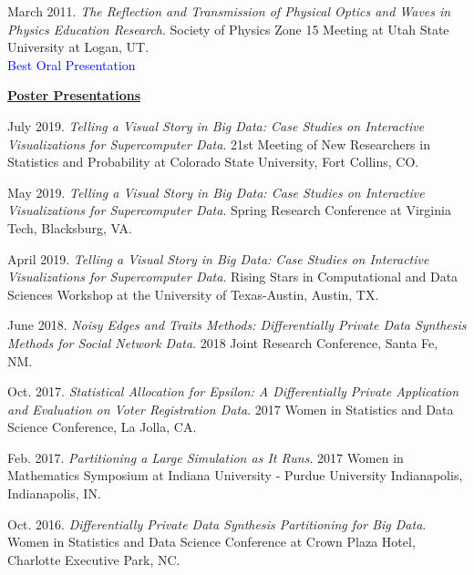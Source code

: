 \begin{etaremune}[topsep=0pt, itemsep=2.5pt, partopsep=0pt, parsep=0pt]
    \item March 2011. \textit{The Reflection and Transmission of Physical Optics and Waves in Physics Education Research}. Society of Physics Zone 15 Meeting at Utah State University at Logan, UT.\\
    \textcolor{blue}{Best Oral Presentation}
  
\vspace{8pt}
\hspace{-0.30in}\underline{\textbf{\large Poster Presentations}}\normalsize
    \item July 2019. \textit{Telling a Visual Story in Big Data: Case Studies on Interactive Visualizations for Supercomputer Data}. 21st Meeting of New Researchers in Statistics and Probability at Colorado State University, Fort Collins, CO.
    
    \item May 2019. \textit{Telling a Visual Story in Big Data: Case Studies on Interactive Visualizations for Supercomputer Data}. Spring Research Conference at Virginia Tech, Blacksburg, VA.
    
    \item April 2019. \textit{Telling a Visual Story in Big Data: Case Studies on Interactive Visualizations for Supercomputer Data}. Rising Stars in Computational and Data Sciences Workshop at the University of Texas-Austin, Austin, TX.
    
    \item June 2018. \textit{Noisy Edges and Traits Methods: Differentially Private Data Synthesis Methods for Social Network Data}. 2018 Joint Research Conference, Santa Fe, NM.
    
    \item Oct. 2017. \textit{Statistical Allocation for Epsilon: A Differentially Private Application and Evaluation on Voter Registration Data}. 2017 Women in Statistics and Data Science Conference, La Jolla, CA.
    
    \item Feb. 2017. \textit{Partitioning a Large Simulation as It Runs}. 2017 Women in Mathematics Symposium at Indiana University - Purdue University Indianapolis, Indianapolis, IN.
    
    \item Oct. 2016. \textit{Differentially Private Data Synthesis Partitioning for Big Data}. Women in Statistics and Data Science Conference at Crown Plaza Hotel, Charlotte Executive Park, NC. 
    

\end{etaremune}
